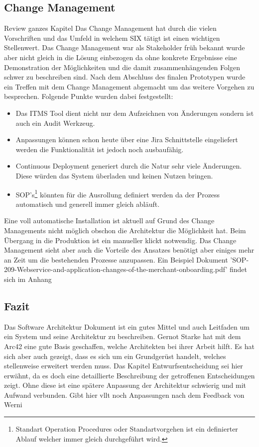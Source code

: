 \subsection{Change Management}

{\color{red} Review ganzes Kapitel}
Das Change Management hat durch die vielen Vorschriften und das Umfeld in welchem SIX tätigt ist einen wichtigen Stellenwert. Das Change Management war als Stakeholder früh bekannt wurde aber nicht gleich in die Lösung einbezogen da ohne konkrete Ergebnisse eine Demonstration der Möglichkeiten und die damit zusammenhängenden Folgen schwer zu beschreiben sind. Nach dem Abschluss des finalen Prototypen wurde ein Treffen mit dem Change Management abgemacht um das weitere Vorgehen zu besprechen. Folgende Punkte wurden dabei festgestellt:
	
\begin{itemize}
	\item Das ITMS Tool dient nicht nur dem Aufzeichnen von Änderungen sondern ist auch ein Audit Werkzeug.
	\item Anpassungen können schon heute über eine Jira Schnittstelle eingeliefert werden die Funktionalität ist jedoch noch ausbaufähig.
	\item Continuous Deployment generiert durch die Natur sehr viele Änderungen. Diese würden das System überladen und keinen Nutzen bringen.
	\item SOP's\footnote{Standart Operation Procedures oder Standartvorgehen ist ein definierter Ablauf welcher immer gleich durchgeführt wird.} könnten für die Ausrollung definiert werden da der Prozess automatisch und generell immer gleich abläuft. 
\end{itemize}

Eine voll automatische Installation ist aktuell auf Grund des Change Managements nicht möglich obschon die Architektur die Möglichkeit hat. Beim Übergang in die Produktion ist ein manueller klickt notwendig. Das Change Management sieht aber auch die Vorteile des Ansatzes benötigt aber einiges mehr an Zeit um die bestehenden Prozesse anzupassen. Ein Beispiel Dokument 'SOP-209-Webservice-and-application-changes-of-the-merchant-onboarding.pdf' findet sich im Anhang 

\subsection{Fazit}

Das Software Architektur Dokument ist ein gutes Mittel und auch Leitfaden um ein System und seine Architektur zu beschreiben. Gernot Starke hat mit dem Arc42 eine gute Basis geschaffen, welche Architekten bei ihrer Arbeit hilft. Es hat sich aber auch gezeigt, dass es sich um ein Grundgerüst handelt, welches stellenweise erweitert werden muss. Das Kapitel Entwurfsentscheidung sei hier erwähnt, da es doch eine detaillierte Beschreibung der getroffenen Entscheidungen zeigt. Ohne diese ist eine spätere Anpassung der Architektur schwierig und mit Aufwand verbunden.
{\color{red} Gibt hier vllt noch Anpassungen nach dem Feedback von Werni}
\newpage
